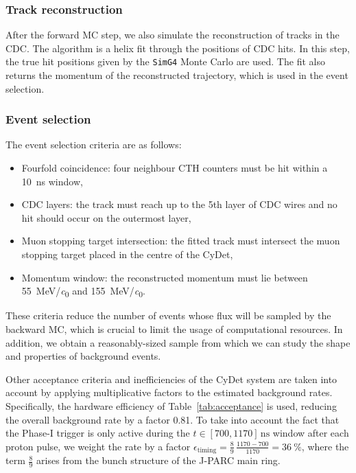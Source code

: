 \subsubsection{Track reconstruction}
After the forward MC step, we also simulate the reconstruction of tracks in the
CDC. The algorithm is a helix fit through the positions of CDC hits. In this step,
the true hit positions given by the \texttt{SimG4} Monte Carlo are used. The fit
also returns the momentum of the reconstructed trajectory, which is used in the
event selection.


\subsubsection{Event selection}
The event selection criteria are as follows:
\begin{itemize}
    \item Fourfold coincidence: four neighbour CTH counters must be hit
    within a \SI{10}{\ns} window,
    \item CDC layers: the track must reach up to the 5th layer of CDC
    wires and no hit should occur on the outermost layer,
    \item Muon stopping target intersection: the fitted track must intersect the
    muon stopping target placed in the centre of the CyDet,
    \item Momentum window: the reconstructed momentum must lie between
    \SI{55}{\MeV/\clight} and \SI{155}{\MeV/\clight}.
\end{itemize}
These criteria reduce the number of events whose flux will be sampled by the
backward MC, which is crucial to limit the usage of computational resources. In
addition, we obtain a reasonably-sized sample from which we can study the shape
and properties of background events.

Other acceptance criteria and inefficiencies of the CyDet system are taken into
account by applying multiplicative factors to the estimated background rates.
Specifically, the hardware efficiency of Table~\ref{tab:acceptance} is used,
reducing the overall background rate by a factor 0.81. To take into account the
fact that the Phase-I trigger is only active during the $t \in [700, 1170]\,
\si{\ns}$ window after each proton pulse, we weight the rate by a factor
$\epsilon_\text{timing} = \frac{8}{9}\,\frac{1170 - 700}{1170} =
\SI{36}{\percent}$, where the term $\frac{8}{9}$ arises from the bunch
structure of the J-PARC main ring.

